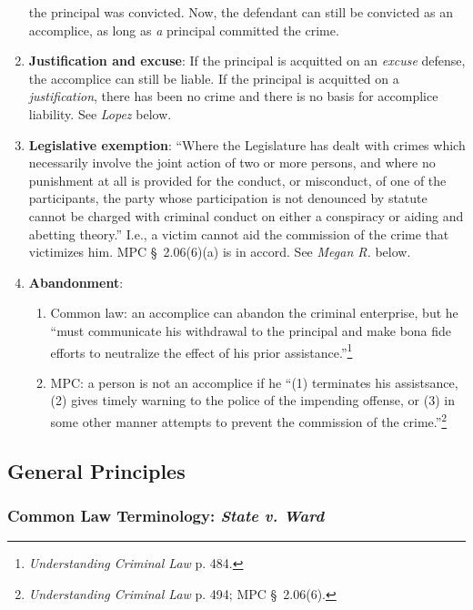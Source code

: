 \begin{enumerate}
    the principal was convicted. Now, the defendant can still be convicted as 
    an accomplice, as long as \emph{a} principal committed the crime.
    \item \textbf{Justification and excuse}: If the principal is acquitted on 
    an \emph{excuse} defense, the accomplice can still be liable. If the 
    principal is acquitted on a \emph{justification}, there has been no crime 
    and there is no basis for accomplice liability. See \emph{Lopez} below.
    \item \textbf{Legislative exemption}: ``Where the Legislature has dealt 
    with crimes which necessarily involve the joint action of two or more 
    persons, and where no punishment at all is provided for the conduct, or 
    misconduct, of one of the participants, the party whose participation is 
    not denounced by statute cannot be charged with criminal conduct on either 
    a conspiracy or aiding and abetting theory.'' I.e., a victim cannot aid 
    the commission of the crime that victimizes him. MPC \S\ 2.06(6)(a) is in 
    accord. See \emph{Megan R.} below.
    \item \textbf{Abandonment}:
    \begin{enumerate}
        \item Common law: an accomplice can abandon the criminal enterprise, 
        but he ``must communicate his withdrawal to the principal and make bona 
        fide efforts to neutralize the effect of his prior 
        assistance.''\footnote{\emph{Understanding Criminal Law} p. 484.}
        \item MPC: a person is not an accomplice if he ``(1) terminates his 
        assistsance, (2) gives timely warning to the police of the impending 
        offense, or (3) in some other manner attempts to prevent the 
        commission of the crime.''\footnote{\emph{Understanding Criminal Law} 
        p. 494; MPC \S\ 2.06(6).}
    \end{enumerate}
\end{enumerate}

\subsection{General Principles}

\subsubsection{Common Law Terminology: \emph{State v. Ward}}


